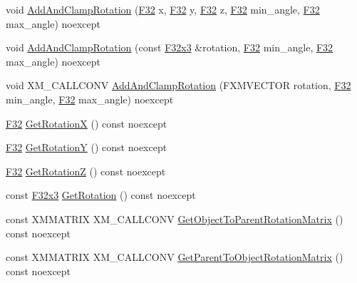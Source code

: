 \begin{DoxyCompactItemize}
\item 
void \hyperlink{classmage_1_1_transform_node_ab12f50db5ea7b78b17c5fb580b6bbdcd}{Add\+And\+Clamp\+Rotation} (\hyperlink{namespacemage_aa97e833b45f06d60a0a9c4fc22ae02c0}{F32} x, \hyperlink{namespacemage_aa97e833b45f06d60a0a9c4fc22ae02c0}{F32} y, \hyperlink{namespacemage_aa97e833b45f06d60a0a9c4fc22ae02c0}{F32} z, \hyperlink{namespacemage_aa97e833b45f06d60a0a9c4fc22ae02c0}{F32} min\+\_\+angle, \hyperlink{namespacemage_aa97e833b45f06d60a0a9c4fc22ae02c0}{F32} max\+\_\+angle) noexcept
\item 
void \hyperlink{classmage_1_1_transform_node_a5e2f0ffdce4f11c38f2b69c7257b71d3}{Add\+And\+Clamp\+Rotation} (const \hyperlink{namespacemage_a73fbe0da4b8d5bc156bb8453e5b63a17}{F32x3} \&rotation, \hyperlink{namespacemage_aa97e833b45f06d60a0a9c4fc22ae02c0}{F32} min\+\_\+angle, \hyperlink{namespacemage_aa97e833b45f06d60a0a9c4fc22ae02c0}{F32} max\+\_\+angle) noexcept
\item 
void X\+M\+\_\+\+C\+A\+L\+L\+C\+O\+NV \hyperlink{classmage_1_1_transform_node_a9d29e51f8cc61aef4ebbe311d27981b2}{Add\+And\+Clamp\+Rotation} (F\+X\+M\+V\+E\+C\+T\+OR rotation, \hyperlink{namespacemage_aa97e833b45f06d60a0a9c4fc22ae02c0}{F32} min\+\_\+angle, \hyperlink{namespacemage_aa97e833b45f06d60a0a9c4fc22ae02c0}{F32} max\+\_\+angle) noexcept
\item 
\hyperlink{namespacemage_aa97e833b45f06d60a0a9c4fc22ae02c0}{F32} \hyperlink{classmage_1_1_transform_node_a716a289997267d8bcda1da28cb679dcc}{Get\+RotationX} () const noexcept
\item 
\hyperlink{namespacemage_aa97e833b45f06d60a0a9c4fc22ae02c0}{F32} \hyperlink{classmage_1_1_transform_node_a620a6a7d11b3541f17e0492fdf48d9ab}{Get\+RotationY} () const noexcept
\item 
\hyperlink{namespacemage_aa97e833b45f06d60a0a9c4fc22ae02c0}{F32} \hyperlink{classmage_1_1_transform_node_a3c08b93f62e5d741c95a97ae9b42e039}{Get\+RotationZ} () const noexcept
\item 
const \hyperlink{namespacemage_a73fbe0da4b8d5bc156bb8453e5b63a17}{F32x3} \hyperlink{classmage_1_1_transform_node_a2419a1e60ce39eaf94c24de226e33a7a}{Get\+Rotation} () const noexcept
\item 
const X\+M\+M\+A\+T\+R\+IX X\+M\+\_\+\+C\+A\+L\+L\+C\+O\+NV \hyperlink{classmage_1_1_transform_node_a6997648419c34b136e2588c1cea97b7e}{Get\+Object\+To\+Parent\+Rotation\+Matrix} () const noexcept
\item 
const X\+M\+M\+A\+T\+R\+IX X\+M\+\_\+\+C\+A\+L\+L\+C\+O\+NV \hyperlink{classmage_1_1_transform_node_a3d4a7607234c65bd2914749f9bd1edbe}{Get\+Parent\+To\+Object\+Rotation\+Matrix} () const noexcept

\end{DoxyCompactItemize}
